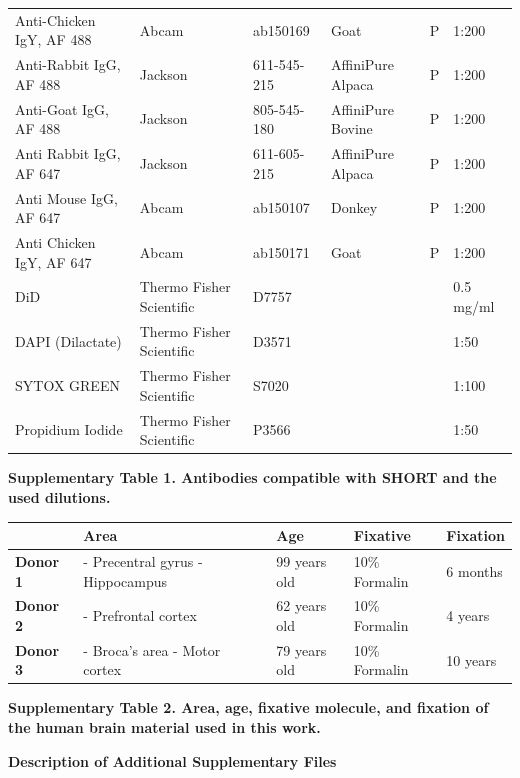 \documentclass{article}
\begin{document}
\begin{center}
\begin{longtable}{llllll}
Anti-Chicken IgY, AF 488 & Abcam & ab150169 & Goat & P & 1:200\\
Anti-Rabbit IgG, AF 488 & Jackson & 611-545-215 & AffiniPure Alpaca & P & 1:200\\
Anti-Goat IgG, AF 488 & Jackson & 805-545-180 & AffiniPure Bovine & P & 1:200\\
Anti Rabbit IgG, AF 647 & Jackson & 611-605-215 & AffiniPure Alpaca & P & 1:200\\
Anti Mouse IgG, AF 647 & Abcam & ab150107 & Donkey & P & 1:200\\
Anti Chicken IgY, AF 647 & Abcam & ab150171 & Goat & P & 1:200\\
DiD & Thermo Fisher Scientific & D7757 &  &  & 0.5 mg/ml\\
DAPI (Dilactate) & Thermo Fisher Scientific & D3571 &  &  & 1:50\\
SYTOX GREEN & Thermo Fisher Scientific & S7020 &  &  & 1:100\\
Propidium Iodide & Thermo Fisher Scientific & P3566 &  &  & 1:50\\
\bottomrule\end{longtable}\end{center}
\noindent \textbf{Supplementary Table 1. Antibodies compatible with SHORT and the used dilutions.}

\begin{center}\begin{tabular}{lllll}\toprule
 & \textbf{Area} & \textbf{Age} & \textbf{Fixative} & \textbf{Fixation}\\\midrule
\textbf{Donor 1} & - Precentral gyrus - Hippocampus & 99 years old & 10\% Formalin & 6 months\\
\textbf{Donor 2} & - Prefrontal cortex & 62 years old & 10\% Formalin & 4 years\\
\textbf{Donor 3} & - Broca’s area - Motor cortex & 79 years old & 10\% Formalin & 10 years\\
\bottomrule\end{tabular}\end{center}
\noindent \textbf{Supplementary Table 2. Area, age, fixative molecule, and fixation of the human brain material used in this work.}


\begin{center}\textbf{Description of Additional Supplementary Files}\end{center}
\end{document}
